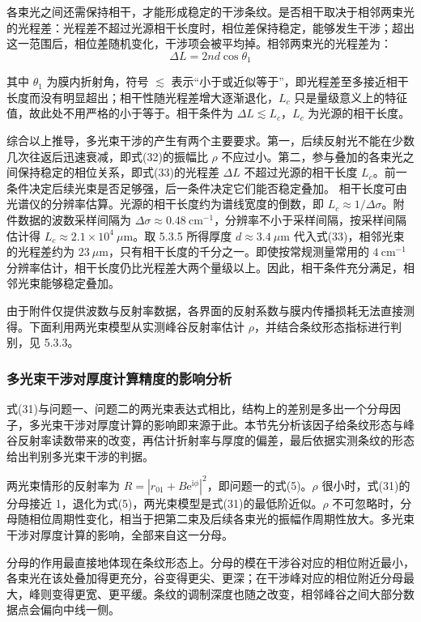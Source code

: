 各束光之间还需保持相干，才能形成稳定的干涉条纹。是否相干取决于相邻两束光的光程差：光程差不超过光源相干长度时，相位差保持稳定，能够发生干涉；超出这一范围后，相位差随机变化，干涉项会被平均掉。相邻两束光的光程差为：
\[
\Delta L=2nd\cos\theta_1 \tag{33}
\]

其中 $\theta_1$ 为膜内折射角，符号 $\lesssim$ 表示“小于或近似等于”，即光程差至多接近相干长度而没有明显超出；相干性随光程差增大逐渐退化，$L_c$ 只是量级意义上的特征值，故此处不用严格的小于等于。相干条件为 $\Delta L\lesssim L_c$，$L_c$ 为光源的相干长度。

综合以上推导，多光束干涉的产生有两个主要要求。第一，后续反射光不能在少数几次往返后迅速衰减，即式(32)的振幅比 $\rho$ 不应过小。第二，参与叠加的各束光之间保持稳定的相位关系，即式(33)的光程差 $\Delta L$ 不超过光源的相干长度 $L_c$。前一条件决定后续光束是否足够强，后一条件决定它们能否稳定叠加。
相干长度可由光谱仪的分辨率估算。光源的相干长度约为谱线宽度的倒数，即 $L_c\approx1/\Delta\sigma$。附件数据的波数采样间隔为 $\Delta\sigma\approx0.48\ \mathrm{cm}^{-1}$，分辨率不小于采样间隔，按采样间隔估计得 $L_c\approx2.1\times10^4\ \mu\mathrm{m}$。取 5.3.5 所得厚度 $d\approx3.4\ \mu\mathrm{m}$ 代入式(33)，相邻光束的光程差约为 $23\ \mu\mathrm{m}$，只有相干长度的千分之一。即使按常规测量常用的 $4\ \mathrm{cm}^{-1}$ 分辨率估计，相干长度仍比光程差大两个量级以上。因此，相干条件充分满足，相邻光束能够稳定叠加。

由于附件仅提供波数与反射率数据，各界面的反射系数与膜内传播损耗无法直接测得。下面利用两光束模型从实测峰谷反射率估计 $\rho$，并结合条纹形态指标进行判别，见 5.3.3。

\subsubsection{多光束干涉对厚度计算精度的影响分析}

式(31)与问题一、问题二的两光束表达式相比，结构上的差别是多出一个分母因子，多光束干涉对厚度计算的影响即来源于此。本节先分析该因子给条纹形态与峰谷反射率读数带来的改变，再估计折射率与厚度的偏差，最后依据实测条纹的形态给出判别多光束干涉的判据。

两光束情形的反射率为 $R=|r_{01}+B\mathrm e^{\mathrm i\phi}|^2$，即问题一的式(5)。$\rho$ 很小时，式(31)的分母接近 1，退化为式(5)，两光束模型是式(31)的最低阶近似。$\rho$ 不可忽略时，分母随相位周期性变化，相当于把第二束及后续各束光的振幅作周期性放大。多光束干涉对厚度计算的影响，全部来自这一分母。

分母的作用最直接地体现在条纹形态上。分母的模在干涉谷对应的相位附近最小，各束光在该处叠加得更充分，谷变得更尖、更深；在干涉峰对应的相位附近分母最大，峰则变得更宽、更平缓。条纹的调制深度也随之改变，相邻峰谷之间大部分数据点会偏向中线一侧。


